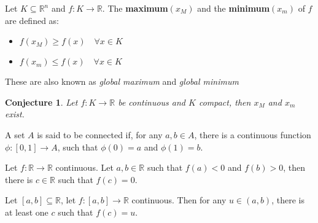 \documentclass[aspectratio=169]{beamer}
\newtheorem{proposition}{Conjecture}[section]
\begin{document}
\begin{frame}
    \begin{definition}
        Let $K\subseteq\mathds{R}^n$ and $f:K\rightarrow\mathds{R}$. The \textbf{maximum}$(x_M)$ and the \textbf{minimum}$(x_m)$ of $f$ are defined as:
        \begin{itemize}
            \item $f(x_M)\geq f(x) \quad \forall x\in K$
            \item $f(x_m)\leq f(x) \quad \forall x\in K$
        \end{itemize}
        
        These are also known as \emph{global maximum} and \emph{global minimum}
    \end{definition}
    
    \begin{proposition}
        Let $f:K\rightarrow\mathds{R}$ be continuous and $K$ compact, then $x_M$ and $x_m$ exist.
    \end{proposition}
\end{frame}

\begin{frame}
    \begin{definition}
        A set $A$ is said to be connected if, for any $a,b\in A$, there is a continuous function $\phi:[0,1]\rightarrow A$, such that $\phi(0)=a$ and $\phi(1)=b$.
    \end{definition}

    \begin{theorem}[Bolzano]
        Let $f:\mathds{R}\rightarrow\mathds{R}$ continuous. Let $a,b\in\mathds{R}$ such that $f(a)<0$ and $f(b)>0$, then there is $c\in\mathds{R}$ such that $f(c)=0$.
    \end{theorem}
    
    \begin{theorem}[Weierstrass]
        
        Let $[a,b]\subseteq\mathds{R}$, let $f:[a,b]\rightarrow\mathds{R}$ continuous. Then for any $u\in(a,b)$, there is at least one $c$ such that $f(c)=u.$
        
    \end{theorem}
\end{frame}
\end{document}
